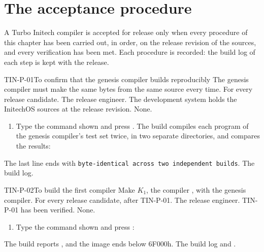\chapter{The acceptance procedure}
\IsThisGoodForTheCompany

A Turbo Initech compiler is accepted for release only when every procedure
of this chapter has been carried out, in order, on the release revision of
the sources, and every verification has been met.  Each procedure is
recorded: the build log of each step is kept with the release.

\begin{AcceptanceProcedure}{TIN-P-01}{To confirm that the genesis compiler builds reproducibly}
The genesis compiler must make the same bytes from the same
source every time.
For every release candidate.
The release engineer.
The development system holds the InitechOS sources at
the release revision.
None.
\begin{enumerate}
\item Type the command shown and press .  The build compiles each
  program of the genesis compiler's test set twice, in two separate
  directories, and compares the results:
\end{enumerate}
The last line ends with \texttt{byte-identical across two independent builds}.
The build log.
\end{AcceptanceProcedure}

\begin{AcceptanceProcedure}{TIN-P-02}{To build the first compiler}
Make $K_1$, the compiler , with the genesis
compiler.
For every release candidate, after TIN-P-01.
The release engineer.
TIN-P-01 has been verified.
None.
\begin{enumerate}
\item Type the command shown and press :
\end{enumerate}
The build reports , and the image ends below
6F000h.
The build log and .
\end{AcceptanceProcedure}

